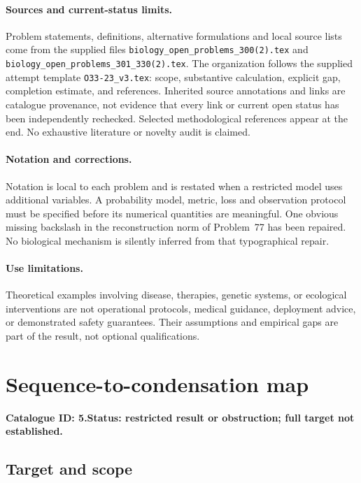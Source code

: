 \documentclass[11pt]{article}
\begin{document}
\paragraph{Sources and current-status limits.}
Problem statements, definitions, alternative formulations and local source lists
come from the supplied files
\texttt{biology\_open\_problems\_300(2).tex} and
\texttt{biology\_open\_problems\_301\_330(2).tex}.
The organization follows the supplied attempt template
\texttt{O33-23\_v3.tex}: scope, substantive calculation, explicit gap,
completion estimate, and references. Inherited source annotations and links are
catalogue provenance, not evidence that every link or current open status has
been independently rechecked. Selected methodological references appear at the
end. No exhaustive literature or novelty audit is claimed.

\paragraph{Notation and corrections.}
Notation is local to each problem and is restated when a restricted model uses
additional variables. A probability model, metric, loss and observation protocol
must be specified before its numerical quantities are meaningful. One obvious
missing backslash in the reconstruction norm of Problem~77 has been repaired.
No biological mechanism is silently inferred from that typographical repair.

\paragraph{Use limitations.}
Theoretical examples involving disease, therapies, genetic systems, or ecological
interventions are not operational protocols, medical guidance, deployment advice,
or demonstrated safety guarantees. Their assumptions and empirical gaps are part
of the result, not optional qualifications.

\setcounter{section}{4}
\section{Sequence-to-condensation map}
\label{prob:005}
\noindent\textbf{Catalogue ID: 5.}\quad \textbf{Status: restricted result or obstruction; full target not established.}
\subsection{Target and scope}
\end{document}
